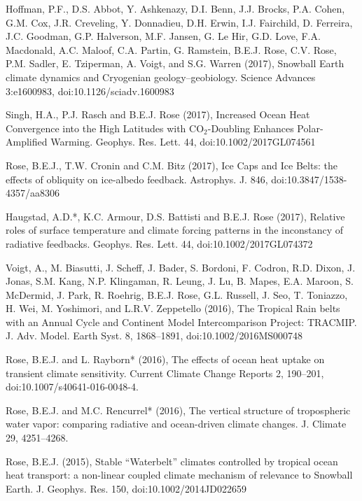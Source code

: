 \documentclass[11pt, letterpaper]{article} %
\newcommand{\years}[1]{\marginnote{\scriptsize #1}} %
\begin{document}
\years{2017}  Hoffman, P.F., D.S. Abbot, Y. Ashkenazy, D.I. Benn, J.J. Brocks, P.A. Cohen, G.M.
  Cox, J.R. Creveling, Y. Donnadieu, D.H. Erwin, I.J. Fairchild, D.
  Ferreira, J.C. Goodman, G.P. Halverson, M.F. Jansen, G. Le Hir, G.D.
  Love, F.A. Macdonald, A.C. Maloof, C.A. Partin, G. Ramstein, B.E.J.
  Rose, C.V. Rose, P.M. Sadler, E. Tziperman, A. Voigt, and S.G. Warren (2017),
  Snowball Earth climate dynamics and Cryogenian geology--geobiology.
  Science Advances 3:e1600983, doi:10.1126/sciadv.1600983

\years{2017}  Singh, H.A., P.J. Rasch and B.E.J. Rose (2017), Increased Ocean Heat Convergence into the High Latitudes with CO$_2$-Doubling Enhances Polar-Amplified Warming. Geophys. Res. Lett. 44, doi:10.1002/2017GL074561

\years{2017}  Rose, B.E.J., T.W. Cronin and C.M. Bitz (2017), Ice Caps and Ice Belts: the effects of obliquity on ice-albedo feedback. Astrophys. J. 846, doi:10.3847/1538-4357/aa8306

\years{2017} Haugstad, A.D.*, K.C. Armour, D.S. Battisti and B.E.J. Rose (2017), Relative roles of surface temperature and climate forcing patterns in the inconstancy of radiative feedbacks. Geophys. Res. Lett. 44, doi:10.1002/2017GL074372

\years{2016}
  Voigt, A., M. Biasutti, J. Scheff, J. Bader, S. Bordoni, F. Codron,
  R.D. Dixon, J. Jonas, S.M. Kang, N.P. Klingaman, R. Leung, J. Lu, B.
  Mapes, E.A. Maroon, S. McDermid, J. Park, R. Roehrig, B.E.J. Rose,
  G.L. Russell, J. Seo, T. Toniazzo, H. Wei, M. Yoshimori, and L.R.V.
  Zeppetello (2016), The Tropical Rain belts with an Annual Cycle and
  Continent Model Intercomparison Project: TRACMIP. J. Adv. Model. Earth
  Syst. 8, 1868--1891, doi:10.1002/2016MS000748
 
\years{2016}  Rose, B.E.J. and L. Rayborn* (2016), The effects of ocean heat uptake on
  transient climate sensitivity. Current Climate Change Reports 2,
  190--201, doi:10.1007/s40641-016-0048-4.
   
\years{2016}  Rose, B.E.J. and M.C. Rencurrel* (2016), The vertical structure of
  tropospheric water vapor: comparing radiative and ocean-driven climate
  changes. J. Climate 29, 4251--4268.
   
\years{2015}  Rose, B.E.J. (2015), Stable ``Waterbelt'' climates controlled by tropical
  ocean heat transport: a non-linear coupled climate mechanism of
  relevance to Snowball Earth. J. Geophys. Res. 150,
  doi:10.1002/2014JD022659
  
\end{document}
